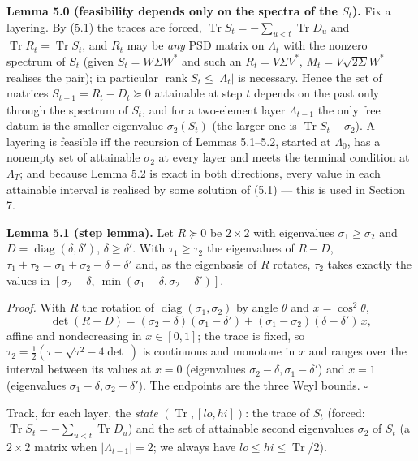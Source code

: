 \documentclass[
  11pt,
  a4paper,
]{article}
\newcounter{none} %
\begin{document}
\textbf{Lemma 5.0 (feasibility depends only on the spectra of the
\(S_t\)).} Fix a layering. By (5.1) the traces are forced,
\(\operatorname{Tr}S_t=-\sum_{u<t}\operatorname{Tr}D_u\) and
\(\operatorname{Tr}R_t=\operatorname{Tr}S_t\), and \(R_t\) may be
\emph{any} PSD matrix on \(\Lambda_t\) with the nonzero spectrum of
\(S_t\) (given \(S_t=W\Sigma W^*\) and such an \(R_t=V\Sigma V^*\),
\(M_t=V\sqrt{2\Sigma}W^*\) realises the pair); in particular
\(\operatorname{rank}S_t\le|\Lambda_t|\) is necessary. Hence the set of
matrices \(S_{t+1}=R_t-D_t\succeq0\) attainable at step \(t\) depends on
the past only through the spectrum of \(S_t\), and for a two-element
layer \(\Lambda_{t-1}\) the only free datum is the smaller eigenvalue
\(\sigma_2(S_t)\) (the larger one is \(\operatorname{Tr}S_t-\sigma_2\)).
A layering is feasible iff the recursion of Lemmas 5.1--5.2, started at
\(\Lambda_0\), has a nonempty set of attainable \(\sigma_2\) at every
layer and meets the terminal condition at \(\Lambda_T\); and because
Lemma 5.2 is exact in both directions, every value in each attainable
interval is realised by some solution of (5.1) --- this is used in
Section 7.

\textbf{Lemma 5.1 (step lemma).} Let \(R\succeq0\) be \(2\times2\) with
eigenvalues \(\sigma_1\ge\sigma_2\) and
\(D=\operatorname{diag}(\delta,\allowbreak{}\delta')\), \(\delta\ge\delta'\). With
\(\tau_1\ge\tau_2\) the eigenvalues of \(R-D\),
\(\tau_1+\tau_2=\sigma_1+\sigma_2-\delta-\delta'\) and, as the
eigenbasis of \(R\) rotates, \(\tau_2\) takes exactly the values in
\([\sigma_2-\delta,\allowbreak{}\ \min(\sigma_1-\delta,\allowbreak{}\sigma_2-\delta')]\).

\emph{Proof.} With \(R\) the rotation of
\(\operatorname{diag}(\sigma_1,\allowbreak{}\sigma_2)\) by angle \(\theta\) and
\(x=\cos^2\theta\),
\[\det(R-D)=(\sigma_2-\delta)(\sigma_1-\delta')+(\sigma_1-\sigma_2)(\delta-\delta')\,x,\]
affine and nondecreasing in \(x\in[0,\allowbreak{}1]\); the trace is fixed, so
\(\tau_2=\tfrac12(\tau-\sqrt{\tau^2-4\det})\) is continuous and monotone
in \(x\) and ranges over the interval between its values at \(x=0\)
(eigenvalues \(\sigma_2-\delta,\allowbreak{}\sigma_1-\delta'\)) and \(x=1\)
(eigenvalues \(\sigma_1-\delta,\allowbreak{}\sigma_2-\delta'\)). The endpoints are
the three Weyl bounds. \(\square\)

Track, for each layer, the \emph{state} \((\operatorname{Tr},\allowbreak{}[lo,\allowbreak{}hi])\):
the trace of \(S_t\) (forced:
\(\operatorname{Tr}S_t=-\sum_{u<t}\operatorname{Tr}D_u\)) and the set of
attainable second eigenvalues \(\sigma_2\) of \(S_t\) (a \(2\times2\)
matrix when \(|\Lambda_{t-1}|=2\); we always have
\(lo\le hi\le\operatorname{Tr}/2\)).
\end{document}
